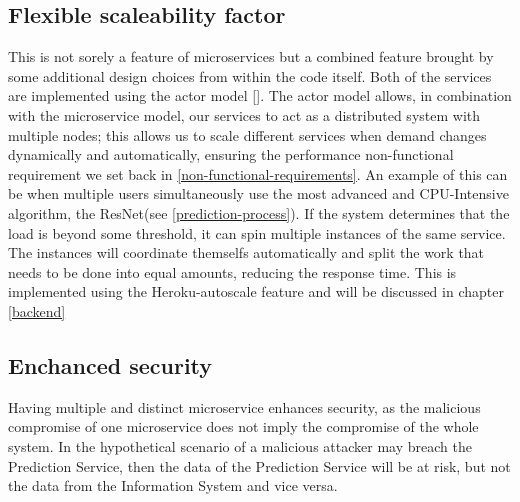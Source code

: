 		\subsection{Flexible scaleability factor}
			\label{flexible-scaleability-factor}
			This is not sorely a feature of microservices but a combined feature brought by some additional design choices 
			from within the code itself. Both of the services are implemented using the actor model [\cite{hewitt2015actor}]. 
			The actor model allows, in combination with the microservice model, our services to act as a distributed system with 
			multiple nodes; this allows us to scale different services when demand changes dynamically and automatically, ensuring 
			the performance non-functional requirement we set back in \ref{non-functional-requirements}. An example of this can be 
			when multiple users simultaneously use the most advanced and CPU-Intensive algorithm, the ResNet(see \ref{prediction-process}). 
			If the system determines that the load is beyond some threshold, it can spin multiple instances of the same service. 
			The instances will coordinate themselfs automatically and split the work that needs to be done into equal amounts, 
			reducing the response time. This is implemented using the Heroku-autoscale feature and will be discussed in chapter \ref{backend}
		\subsection{Enchanced security}
			Having multiple and distinct microservice enhances security, as the malicious compromise of one microservice does not
			 imply the compromise of the whole system. In the hypothetical scenario of a malicious attacker may breach the 
			 Prediction Service, then the data of the Prediction Service will be at risk, but not the data from the Information 
			 System and vice versa.
